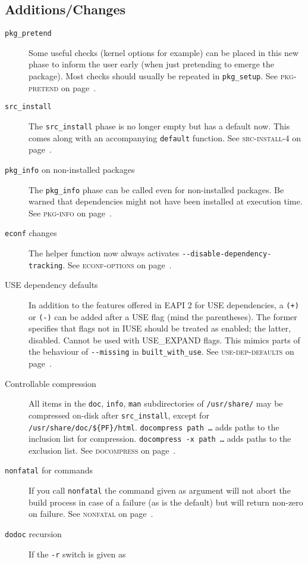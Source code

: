 \documentclass[a4paper,nofoldmark]{leaflet}
\newcommand{\code}[1]{\texttt{#1}}
\newcommand{\featureref}[1]{\textsc{#1} on page~\pageref{feat:#1}}
\begin{document}
\subsection{Additions/Changes}
\label{sec:cs:eapi4-additions}
\begin{description}
    \item[\code{pkg_pretend}] Some useful checks (kernel options for
    example) can be placed in this new phase to inform the user early
    (when just pretending to emerge the package).  Most checks should
    usually be repeated in \code{pkg_setup}.
    See \featureref{pkg-pretend}.
    \item[\code{src_install}] The \code{src_install} phase is no
    longer empty but has a default now.  This comes along with an
    accompanying \code{default} function.
    See \featureref{src-install-4}.
    \item[\code{pkg_info} on non-installed packages] The
    \code{pkg_info} phase can be called even for non-installed
    packages.  Be warned that dependencies might not have been
    installed at execution time.  See \featureref{pkg-info}.
    \item[\code{econf} changes] The helper function now always
    activates \code{-{}-disable-dependency-tracking}.
    See \featureref{econf-options}.
    \item[USE dependency defaults] In addition to the features offered
    in EAPI 2 for USE dependencies, a \code{(+)} or \code{(-)} can be
    added after a USE flag (mind the parentheses).  The former
    specifies that flags not in IUSE should be treated as enabled; the
    latter, disabled. Cannot be used with USE_EXPAND flags.  This
    mimics parts of the behaviour of \code{-{}-missing} in
    \code{built_with_use}.  See \featureref{use-dep-defaults}.
    \item[Controllable compression] All items in the \code{doc},
    \code{info}, \code{man} subdirectories of \code{/usr/share/} may
    be compressed on-disk after \code{src_install}, except for
    \code{/usr/share/doc/\$\{PF\}/html}.  \code{docompress path \dots}
    adds paths to the inclusion list for compression.
    \code{docompress -x path \dots} adds paths to the exclusion list.
    See \featureref{docompress}.
    \item[\code{nonfatal} for commands] If you call \code{nonfatal}
    the command given as argument will not abort the build process in
    case of a failure (as is the default) but will return non-zero on
    failure.
    See \featureref{nonfatal}.
    \item[\code{dodoc} recursion] If the \code{-r} switch is given as

\end{description}
\end{document}
